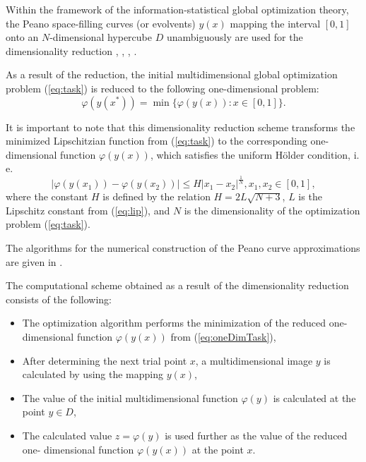 \documentclass[runningheads]{llncs}
\begin{document}
Within the framework of the information-statistical global optimization theory,
the Peano space-filling curves (or evolvents) \(y(x)\) mapping the interval \([0,1]\)
onto an \(N\)-dimensional hypercube \(D\) unambiguously are used for the dimensionality
reduction \cite{sergeyevStronginLera2013}, \cite{strongin1978},
\cite{stronginGergelBarkalovParGO}, \cite{strSergGO}.
\par
As a result of the reduction, the initial multidimensional global optimization
problem (\ref{eq:task}) is reduced to the following one-dimensional problem:
\begin{equation}
\label{eq:oneDimTask}
\varphi(y(x^*))=\min\{\varphi(y(x)):x\in [0,1]\}.
\end{equation}
\par
It is important to note that this dimensionality reduction scheme transforms the minimized
Lipschitzian function from (\ref{eq:task}) to the corresponding one-dimensional
function \(\varphi(y(x))\), which satisfies the uniform H{\"o}lder condition, i. e.
\begin{equation}
\label{eq:holder}
|\varphi(y(x_1))-\varphi(y(x_2))|\leq H{|x_1-x_2|}^{\frac{1}{N}}, x_1,x_2\in[0,1],
\end{equation}
where the constant $H$ is defined by the relation \(H=2L\sqrt{N+3}\), \(L\) is the Lipschitz
constant from (\ref{eq:lip}), and \(N\) is the dimensionality of the optimization problem
(\ref{eq:task}).
\par
The algorithms for the numerical construction of the Peano curve approximations are
given in \cite{strSergGO}.

\par
The computational scheme obtained as a result of the dimensionality reduction consists of the
following:
\begin{itemize}
  \item The optimization algorithm performs the minimization of the reduced one-dimensional
  function \(\varphi(y(x))\) from (\ref{eq:oneDimTask}),
  \item After determining the next trial point \(x\), a multidimensional image \(y\) is calculated by
using the mapping \(y(x)\),
  \item The value of the initial multidimensional function \(\varphi(y)\) is calculated at the point
\(y\in D\),
  \item The calculated value \(z=\varphi(y)\) is used further as the value of the reduced one-
dimensional function \(\varphi(y(x))\) at the point \(x\).
\end{itemize}
\end{document}

